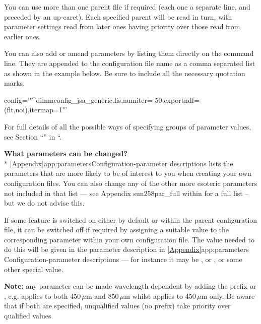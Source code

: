 You can use more than one parent file if required (each one a separate
line, and preceded by an up-caret). Each specified parent will be read in
turn, with parameter settings read from later ones having priority over
those read from earlier ones.

You can also add or amend parameters by listing them directly on the
command line. They are appended to the configuration file name as a
comma separated list as shown in the example below. Be sure to include
all the necessary quotation marks.

\begin{terminalv}
       config='"^dimmconfig_jsa_generic.lis,numiter=-50,exportndf=(flt,noi),itermap=1"'
\end{terminalv}

For full details of all the possible ways of specifying groups of
parameter values, see Section ``'' in ``.

\textbf{What parameters can be changed?}\\*
\cref{Appendix}{app:parameters}{Configuration-parameter descriptions}
lists the parameters that are more likely to be of interest to you when
creating your own configuration files. You can also change any of the
other more esoteric parameters not included in that list --- see
Appendix  {sun258}{par_full} within  for a full list -- but we do not advise this.

\begin{tip}
  If some feature is switched on either by default or within
  the parent configuration file, it can be switched off if required
  by assigning a suitable value to the corresponding parameter within
  your own configuration file. The value needed to do this will be
  given in the parameter description in \cref{Appendix}{app:parameters}
  {Configuration-parameter descriptions} --- for instance it may be
  , or , or some other special value.
\end{tip}

\textbf{Note:} any parameter can be made wavelength dependent by
adding the prefix  or , e.g.
 applies to both 450\,$\mu$m and
850\,$\mu$m whilst  applies to
450\,$\mu$m only. Be aware that if both are specified, unqualified
values (no prefix) take priority over qualified values.

